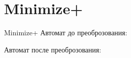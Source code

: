 \section{Minimize+}
\begin{frame}{Minimize+}
	Автомат до преоброзования:


	Автомат после преоброзования:

\end{frame}
